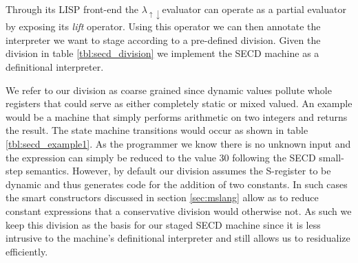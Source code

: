 \documentclass[a4paper,12pt,twoside,openright]{report}
\theoremstyle{definition}
\newcommand{\mslang}{$\lambda_{\uparrow\downarrow}$}
\begin{document}
Through its LISP front-end the \mslang evaluator can operate as a partial evaluator by exposing its \textit{lift} operator. Using this operator we can then annotate the interpreter we want to stage according to a pre-defined division. Given the division in table \ref{tbl:secd_division} we implement the SECD machine as a definitional interpreter.

We refer to our division as coarse grained since dynamic values pollute whole registers that could serve as either completely static or mixed valued. An example would be a machine that simply performs arithmetic on two integers and returns the result. The state machine transitions would occur as shown in table \ref{tbl:secd_example1}. As the programmer we know there is no unknown input and the expression can simply be reduced to the value 30 following the SECD small-step semantics. However, by default our division assumes the S-register to be dynamic and thus generates code for the addition of two constants. In such cases the smart constructors discussed in section \ref{sec:mslang} allow as to reduce constant expressions that a conservative division would otherwise not. As such we keep this division as the basis for our staged SECD machine since it is less intrusive to the machine's definitional interpreter and still allows us to residualize efficiently.
\end{document}
